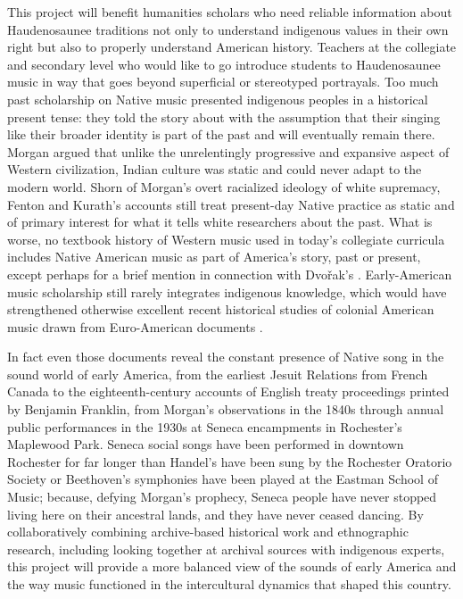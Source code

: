 \documentclass{neh}
\begin{document}
This project will benefit humanities scholars who need reliable information
about Haudenosaunee traditions not only to understand indigenous values in
their own right but also to properly understand American history.
Teachers at the collegiate and secondary level who would like to go introduce
students to Haudenosaunee music in way that goes beyond superficial or
stereotyped portrayals.
Too much past scholarship on Native music presented indigenous peoples in a
historical present tense: they told the story about 
with the assumption that their singing like their broader identity is part
of the past and will eventually remain there.
Morgan argued that unlike the unrelentingly progressive and expansive aspect
of Western civilization, Indian culture was static and could never adapt to
the modern world. 
Shorn of Morgan's overt racialized ideology of white supremacy, Fenton and
Kurath's accounts still treat present-day Native practice as static and of
primary interest for what it tells white researchers about the past.
What is worse, no textbook history of Western music used in today's collegiate
curricula includes Native American music as part of America's story, past or
present, except perhaps for a brief mention in connection with Dvo\v{r}ak's
.
Early-American music scholarship still rarely integrates indigenous knowledge,
which would have strengthened otherwise excellent recent historical studies of
colonial American music drawn from Euro-American documents
\Autocites{Goodman:IndianPsalmody}{Eyerly:Moravian}.

In fact even those documents reveal the constant presence of Native song in
the sound world of early America, from the earliest Jesuit Relations from
French Canada to the eighteenth-century accounts of English treaty proceedings
printed by Benjamin Franklin, from Morgan's observations in the 1840s through
annual public performances in the 1930s at Seneca encampments in Rochester's
Maplewood Park.
Seneca social songs have been performed in downtown Rochester for far longer
than Handel's  have been sung by the Rochester Oratorio
Society or Beethoven's symphonies have been played at the Eastman School of
Music; because, defying Morgan's prophecy, Seneca people have never stopped
living here on their ancestral lands, and they have never ceased dancing.
By collaboratively combining archive-based historical work and ethnographic
research, including looking together at archival sources with indigenous
experts, this project will provide a more balanced view of the sounds of early
America and the way music functioned in the intercultural dynamics that
shaped this country.
\end{document}
